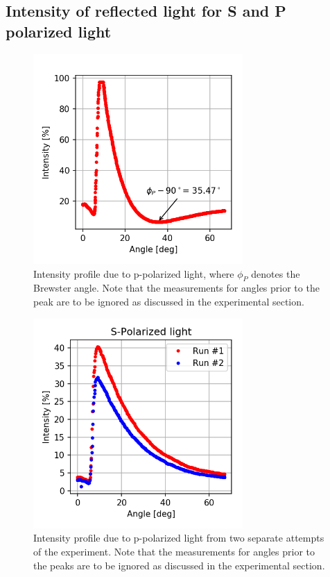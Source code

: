 \documentclass[11pt,a4paper]{article}
\begin{document}
  \subsection{Intensity of reflected light for S and P polarized light \label{sect:res_prism}}

  \begin{figure}[H]
    \center
    \includegraphics[width=8cm]{scripts/ppolar.png}
    \caption{Intensity profile due to p-polarized light, where $\phi_P$ denotes the Brewster angle. Note that the measurements for angles prior to the peak are to be ignored as discussed in the experimental section.}
  \end{figure}

  \begin{figure}[H]
    \center
    \includegraphics[width=8cm]{scripts/spolar.png}
    \caption{Intensity profile due to p-polarized light from two separate attempts of the experiment. Note that the measurements for angles prior to the peaks are to be ignored as discussed in the experimental section.}
  \end{figure}
\end{document}
